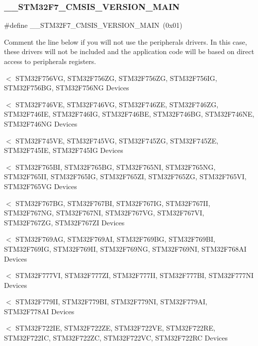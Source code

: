 \subsubsection{\texorpdfstring{\_\_STM32F7\_CMSIS\_VERSION\_MAIN}{\_\_STM32F7\_CMSIS\_VERSION\_MAIN}}
{\footnotesize\ttfamily \#define \+\_\+\+\_\+\+S\+T\+M32\+F7\+\_\+\+C\+M\+S\+I\+S\+\_\+\+V\+E\+R\+S\+I\+O\+N\+\_\+\+M\+A\+IN~(0x01)}



Comment the line below if you will not use the peripherals drivers. In this case, these drivers will not be included and the application code will be based on direct access to peripherals registers. 

$<$ S\+T\+M32\+F756\+VG, S\+T\+M32\+F756\+ZG, S\+T\+M32\+F756\+ZG, S\+T\+M32\+F756\+IG, S\+T\+M32\+F756\+BG, S\+T\+M32\+F756\+NG Devices

$<$ S\+T\+M32\+F746\+VE, S\+T\+M32\+F746\+VG, S\+T\+M32\+F746\+ZE, S\+T\+M32\+F746\+ZG, S\+T\+M32\+F746\+IE, S\+T\+M32\+F746\+IG, S\+T\+M32\+F746\+BE, S\+T\+M32\+F746\+BG, S\+T\+M32\+F746\+NE, S\+T\+M32\+F746\+NG Devices

$<$ S\+T\+M32\+F745\+VE, S\+T\+M32\+F745\+VG, S\+T\+M32\+F745\+ZG, S\+T\+M32\+F745\+ZE, S\+T\+M32\+F745\+IE, S\+T\+M32\+F745\+IG Devices

$<$ S\+T\+M32\+F765\+BI, S\+T\+M32\+F765\+BG, S\+T\+M32\+F765\+NI, S\+T\+M32\+F765\+NG, S\+T\+M32\+F765\+II, S\+T\+M32\+F765\+IG, S\+T\+M32\+F765\+ZI, S\+T\+M32\+F765\+ZG, S\+T\+M32\+F765\+VI, S\+T\+M32\+F765\+VG Devices

$<$ S\+T\+M32\+F767\+BG, S\+T\+M32\+F767\+BI, S\+T\+M32\+F767\+IG, S\+T\+M32\+F767\+II, S\+T\+M32\+F767\+NG, S\+T\+M32\+F767\+NI, S\+T\+M32\+F767\+VG, S\+T\+M32\+F767\+VI, S\+T\+M32\+F767\+ZG, S\+T\+M32\+F767\+ZI Devices

$<$ S\+T\+M32\+F769\+AG, S\+T\+M32\+F769\+AI, S\+T\+M32\+F769\+BG, S\+T\+M32\+F769\+BI, S\+T\+M32\+F769\+IG, S\+T\+M32\+F769\+II, S\+T\+M32\+F769\+NG, S\+T\+M32\+F769\+NI, S\+T\+M32\+F768\+AI Devices

$<$ S\+T\+M32\+F777\+VI, S\+T\+M32\+F777\+ZI, S\+T\+M32\+F777\+II, S\+T\+M32\+F777\+BI, S\+T\+M32\+F777\+NI Devices

$<$ S\+T\+M32\+F779\+II, S\+T\+M32\+F779\+BI, S\+T\+M32\+F779\+NI, S\+T\+M32\+F779\+AI, S\+T\+M32\+F778\+AI Devices

$<$ S\+T\+M32\+F722\+IE, S\+T\+M32\+F722\+ZE, S\+T\+M32\+F722\+VE, S\+T\+M32\+F722\+RE, S\+T\+M32\+F722\+IC, S\+T\+M32\+F722\+ZC, S\+T\+M32\+F722\+VC, S\+T\+M32\+F722\+RC Devices

